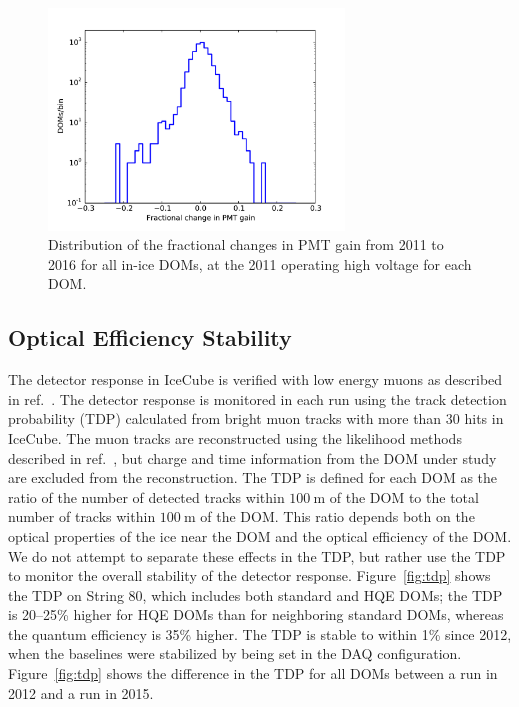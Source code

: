 \begin{figure}[!h]
 \centering
 \includegraphics[width=0.7\textwidth]{graphics/dom/reliability/pmt_gainshift.pdf}
 \caption{Distribution of the fractional changes in PMT gain from 2011 to 2016 for all in-ice
   DOMs, at the 2011 operating high voltage for each DOM.}
 \label{fig:pmt_gainshift}
\end{figure}

\subsection{\label{sec:optical_stability}Optical Efficiency Stability}

The detector response in IceCube is verified with low energy muons as
described in ref.~\cite{IC3:ereco}. The detector response is monitored in each run using the track
detection probability (TDP) calculated from bright muon tracks
with more than 30 hits in IceCube. The muon 
tracks are reconstructed using the likelihood methods described in
ref.~\cite{Ahrens:2003fg}, but charge and time information from the DOM under
study are excluded from the reconstruction. The TDP is
defined for each DOM as the ratio of the number of detected tracks
within $\SI{100}{\meter}$ of the DOM to the total number of tracks within $\SI{100}{\meter}$ of
the DOM. This ratio depends both on the optical properties of the ice
near the DOM and the optical efficiency of the DOM. We do not attempt
to separate
these effects in the TDP, but rather use the TDP to monitor the
overall stability of the detector response. Figure~\ref{fig:tdp} shows the TDP on
String 80, which includes both standard and HQE DOMs; the TDP is
20--25\% higher for HQE DOMs than for neighboring standard
DOMs, whereas the quantum efficiency is 35\% higher. The TDP is stable to within 1\% since 2012, when the baselines
were stabilized by being set in the DAQ configuration. Figure~\ref{fig:tdp} shows
the difference in the TDP for all DOMs between a run in 2012 and a run
in 2015.

